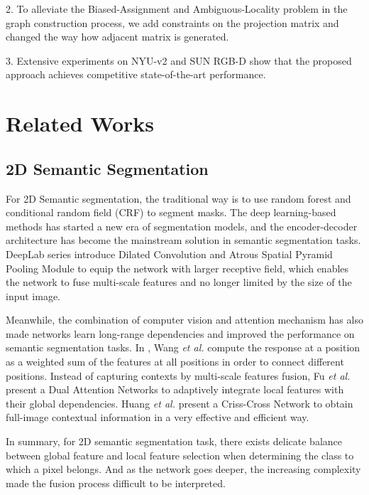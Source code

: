 ﻿\documentclass[journal]{IEEEtran}
\begin{document}
    2. To alleviate the Biased-Assignment and Ambiguous-Locality problem in the graph construction process, we add constraints on the projection matrix and changed the way how adjacent matrix is generated.

    3. Extensive experiments on NYU-v2 and SUN RGB-D show that the proposed approach achieves competitive state-of-the-art performance. 

\section{Related Works} \label{sec_related}

\subsection{2D Semantic Segmentation}

 
    For 2D Semantic segmentation, the traditional way is to use random forest and conditional random field (CRF) to segment masks. The deep learning-based methods \cite{long2015fully} has started a new era of segmentation models, and the encoder-decoder architecture has become the mainstream solution in semantic segmentation tasks\cite{unet}. DeepLab series \cite{chen2017deeplab}\cite{cheng2020panoptic} introduce Dilated Convolution and Atrous Spatial Pyramid Pooling Module to equip the network with larger receptive field, which enables the network to fuse multi-scale features and no longer limited by the size of the input image. 
    
 
    Meanwhile, the combination of computer vision and attention mechanism has also made networks learn long-range dependencies and improved the performance on semantic segmentation tasks. In \cite{NonLocal2018}, Wang \emph{et al.} compute the response at a position as a weighted sum of the features at all positions in order to connect different positions. Instead of capturing contexts by multi-scale features fusion, Fu \emph{et al.} \cite{fu2019dual} present a Dual Attention Networks to adaptively integrate local features with their global dependencies. Huang \emph{et al.} \cite{huang2018ccnet} present a Criss-Cross Network to obtain full-image contextual information in a very effective and efficient way.
    
 
    In summary, for 2D semantic segmentation task, there exists delicate balance between global feature and local feature selection when determining the class to which a pixel belongs. And as the network goes deeper, the increasing complexity made the fusion process difficult to be interpreted.
    
\end{document}
